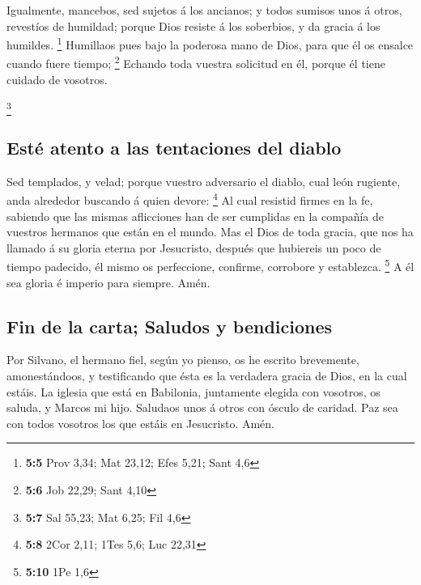  Igualmente, mancebos, sed sujetos á los ancianos; y todos
sumisos unos á otros, revestíos de humildad; porque Dios resiste á los
soberbios, y da gracia á los humildes. \footnote{\textbf{5:5} Prov 3,34;
  Mat 23,12; Efes 5,21; Sant 4,6}  Humillaos pues bajo la
poderosa mano de Dios, para que él os ensalce cuando fuere tiempo;
\footnote{\textbf{5:6} Job 22,29; Sant 4,10}  Echando toda
vuestra solicitud en él, porque él tiene cuidado de vosotros.

\footnote{\textbf{5:7} Sal 55,23; Mat 6,25; Fil 4,6}

\hypertarget{estuxe9-atento-a-las-tentaciones-del-diablo}{%
\subsection{Esté atento a las tentaciones del
diablo}\label{estuxe9-atento-a-las-tentaciones-del-diablo}}

 Sed templados, y velad; porque vuestro adversario el
diablo, cual león rugiente, anda alrededor buscando á quien devore:
\footnote{\textbf{5:8} 2Cor 2,11; 1Tes 5,6; Luc 22,31}  Al
cual resistid firmes en la fe, sabiendo que las mismas aflicciones han
de ser cumplidas en la compañía de vuestros hermanos que están en el
mundo.  Mas el Dios de toda gracia, que nos ha llamado á su
gloria eterna por Jesucristo, después que hubiereis un poco de tiempo
padecido, él mismo os perfeccione, confirme, corrobore y establezca.
\footnote{\textbf{5:10} 1Pe 1,6}  A él sea gloria é imperio
para siempre. Amén.

\hypertarget{fin-de-la-carta-saludos-y-bendiciones}{%
\subsection{Fin de la carta; Saludos y
bendiciones}\label{fin-de-la-carta-saludos-y-bendiciones}}

 Por Silvano, el hermano fiel, según yo pienso, os he
escrito brevemente, amonestándoos, y testificando que ésta es la
verdadera gracia de Dios, en la cual estáis.  La iglesia
que está en Babilonia, juntamente elegida con vosotros, os saluda, y
Marcos mi hijo.  Saludaos unos á otros con ósculo de
caridad. Paz sea con todos vosotros los que estáis en Jesucristo. Amén.
